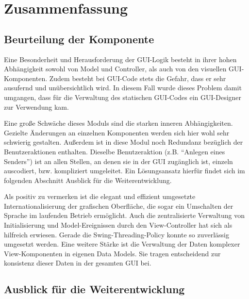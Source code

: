 \chapter{Zusammenfassung}

\section{Beurteilung der Komponente}

    Eine Besonderheit und Herausforderung der GUI-Logik besteht in ihrer hohen
    Abhängigkeit sowohl von Model und Controller, als auch von den visuellen
    GUI-Komponenten. Zudem besteht bei GUI-Code stets die Gefahr, dass er sehr
    ausufernd und unübersichtlich wird. In diesem Fall wurde dieses Problem
    damit umgangen, dass für die Verwaltung des statischen GUI-Codes ein
    GUI-Designer zur Verwendung kam.
    
    Eine große Schwäche dieses Moduls sind die starken inneren Abhängigkeiten.
    Gezielte Änderungen an einzelnen Komponenten werden sich hier wohl sehr
    schwierig gestalten. Außerdem ist in diese Modul noch Redundanz bezüglich
    der Benutzeraktionen enthalten. Dieselbe Benutzeraktion (z.B. "`Anlegen
    eines Senders"') ist an allen Stellen, an denen sie in der GUI zugänglich
    ist, einzeln auscodiert, bzw. kompliziert umgeleitet. Ein Lösungsansatz
    hierfür findet sich im folgenden Abschnitt Ausblick für die
    Weiterentwicklung.
    
    Als positiv zu vermerken ist die elegant und effizient umgesetzte
    Internationalisierung der grafischen Oberfläche, die sogar ein Umschalten
    der Sprache im laufenden Betrieb ermöglicht. Auch die zentralisierte
    Verwaltung von Initialisierung und Model-Ereignissen durch den
    View-Controller hat sich als hilfreich erwiesen. Gerade die
    Swing-Threading-Policy konnte so zuverlässig umgesetzt werden. Eine weitere
    Stärke ist die Verwaltung der Daten komplexer View-Komponenten in eigenen
    Data Models. Sie tragen entscheidend zur konsistenz dieser Daten in der
    gesamten GUI bei.

\section{Ausblick für die Weiterentwicklung}

